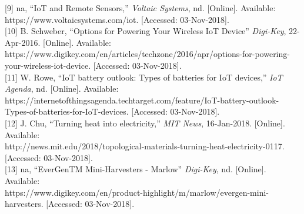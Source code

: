 \documentclass[10pt,draftclsnofoot,onecolumn,letterpaper]{article}
\begin{document}
{    [9] na, “IoT and Remote Sensors,” \textit{Voltaic Systems}, nd. [Online]. Available: https://www.voltaicsystems.com/iot. [Accessed: 03-Nov-2018].\\
    
    [10] B. Schweber, “Options for Powering Your Wireless IoT Device” \textit{Digi-Key}, 22-Apr-2016. [Online]. Available: https://www.digikey.com/en/articles/techzone/2016/apr/options-for-powering-your-wireless-iot-device. [Accessed: 03-Nov-2018].\\
    
    [11] W. Rowe, “IoT battery outlook: Types of batteries for IoT devices,” \textit{IoT Agenda}, nd. [Online]. Available: https://internetofthingsagenda.techtarget.com/feature/IoT-battery-outlook-Types-of-batteries-for-IoT-devices. [Accessed: 03-Nov-2018].\\
    
    [12] J. Chu, “Turning heat into electricity,” \textit{MIT News}, 16-Jan-2018. [Online]. Available:\\ http://news.mit.edu/2018/topological-materials-turning-heat-electricity-0117. [Accessed: 03-Nov-2018].\\
    
    [13] na, “EverGenTM Mini-Harvesters - Marlow” \textit{Digi-Key}, nd. [Online]. Available:\\ https://www.digikey.com/en/product-highlight/m/marlow/evergen-mini-harvesters. [Accessed: 03-Nov-2018].\\
    
    \selectfont 
    \par}\par
    
    
\end{document}
